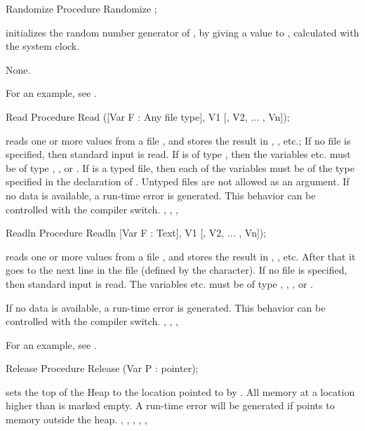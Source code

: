 \documentclass{report}
\begin{document}
\html{}
\begin{procedure}{Randomize}
\Declaration
Procedure Randomize ;

\Description
{} initializes the random number generator of \fpc, by giving
a value to , calculated with the system clock.

\Errors
None.
\SeeAlso
{}
\end{procedure}
For an example, see .
\begin{procedure}{Read}
\Declaration
Procedure Read ([Var F : Any file type], V1 [, V2, ... , Vn]);

\Description
{} reads one or more values from a file , and stores the
result in , , etc.; If no file  is specified, then
standard input is read.
If  is of type , then the variables  etc. must be
of type , ,  or .
If  is a typed file, then each of the variables must be of the type
specified in the declaration of . Untyped files are not allowed as an
argument.
\Errors
If no data is available, a run-time error is generated. This behavior can
be controlled with the  compiler switch.
\SeeAlso
{}, , , 
\end{procedure}
\html{}
\begin{procedure}{Readln}
\Declaration
Procedure Readln [Var F : Text], V1 [, V2, ... , Vn]);

\Description
{} reads one or more values from a file , and stores the
result in , , etc. After that it goes to the next line in
the file (defined by the  character). 
If no file  is specified, then standard input is read.
The variables  etc. must be of type , , 
,  or .

\Errors
If no data is available, a run-time error is generated. This behavior can
be controlled with the  compiler switch.
\SeeAlso
{}, , , 
\end{procedure}
For an example, see .
\begin{procedure}{Release}
\Declaration
Procedure Release (Var P : pointer);

\Description
{} sets the top of the Heap to the location pointed to by
. All memory at a location higher than  is marked empty.
\Errors
A run-time error will be generated if  points to memory outside the
heap.
\SeeAlso
{}, , , , 
, 
\end{procedure}
\end{document}
